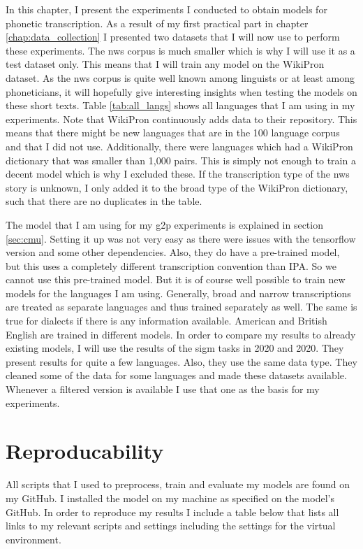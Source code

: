 
\label{chap:exp}
In this chapter, I present the experiments I conducted to obtain models for phonetic transcription. As a result of my first practical part in chapter \ref{chap:data_collection} I presented two datasets that I will now use to perform these experiments. The \ac{nws} corpus is much smaller which is why I will use it as a test dataset only. This means that I will train any model on the WikiPron dataset. As the \ac{nws} corpus is quite well known among linguists or at least among phoneticians, it will hopefully give interesting insights when testing the models on these short texts. Table \ref{tab:all_langs} shows all languages that I am using in my experiments. Note that WikiPron continuously adds data to their repository. This means that there might be new languages that are in the 100 language corpus and that I did not use. Additionally, there were languages which had a WikiPron dictionary that was smaller than 1,000 pairs. This is simply not enough to train a decent model which is why I excluded these. If the transcription type of the \ac{nws} story is unknown, I only added it to the broad type of the WikiPron dictionary, such that there are no duplicates in the table. 

The model that I am using for my \ac{g2p} experiments is explained in section \ref{sec:cmu}. Setting it up was not very easy as there were issues with the tensorflow version and some other dependencies. Also, they do have a pre-trained model, but this uses a completely different transcription convention than IPA. So we cannot use this pre-trained model. But it is of course well possible to train  new models for the languages I am using. Generally, broad and narrow transcriptions are treated as separate languages and thus trained separately as well. The same is true for dialects if there is any information available. American and British English are trained in different models. In order to compare my results to already existing models, I will use the results of the \ac{sigm} tasks in 2020 and 2020. They present results for quite a few languages. Also, they use the same data type. They cleaned some of the data for some languages and made these datasets available. Whenever a filtered version is available I use that one as the basis for my experiments. 

\section{Reproducability}
All scripts that I used to preprocess, train and evaluate my models are found on my GitHub. I installed the model on my machine as specified on the model's GitHub. In order to reproduce my results I include a table below that lists all links to my relevant scripts and settings including the settings for the virtual environment. 


